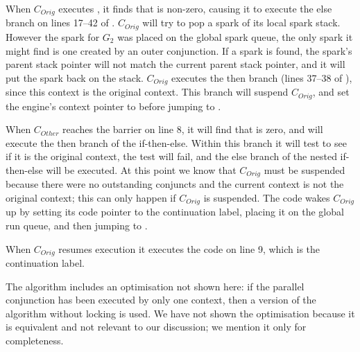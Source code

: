 \begin{description}
    When $C_{Orig}$ executes \joinandcontinue,
    it finds that  is non-zero,
    causing it to execute the else branch on lines 17--42 of \joinandcontinue.
    $C_{Orig}$ will try to pop a spark of its local spark stack.
    However the spark for $G_2$ was placed on the global
    spark queue,
    the only spark it might find is one created by an outer conjunction.
    If a spark is found, the spark's parent stack pointer will not match the
    current parent stack pointer,
    and it will put the spark back on the stack.
    $C_{Orig}$ executes the then branch (lines 37--38 of \joinandcontinue),
    since this context is the original context.
    This branch will suspend $C_{Orig}$,
    and set the engine's context pointer to \NULL
    before jumping to \idle.

    When $C_{Other}$ reaches the barrier on line 8,
    it will find that  is zero,
    and will execute the then branch of the if-then-else.
    Within this branch it will test to see if it is the original
    context,
    the test will fail, and the else branch of the nested if-then-else
    will be executed.
    At this point we know that $C_{Orig}$ must be suspended because
    there were no outstanding conjuncts and the current context is not
    the original context;
    this can only happen if $C_{Orig}$ is suspended.
    The code wakes $C_{Orig}$ up by
    setting its code pointer to the continuation label,
    placing it on the global run queue,
    and then jumping to \idle.

    When $C_{Orig}$ resumes execution it executes the code on line 9,
    which is the continuation label.

\end{description}

The algorithm includes an optimisation not shown here:
if the parallel conjunction has been executed by only one context,
then a version of the algorithm without locking is used.
We have not shown the optimisation because it is equivalent and not relevant
to our discussion;
we mention it only for completeness.

